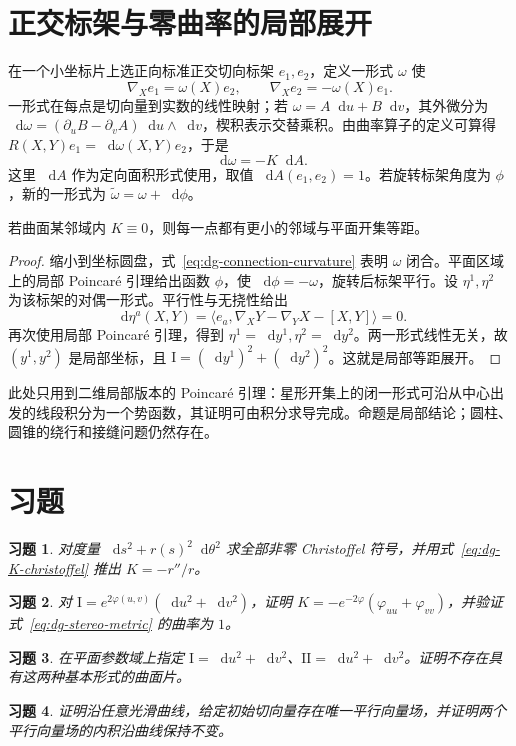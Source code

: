 \documentclass[UTF8,12pt,a4paper,fontset=fandol]{ctexbook}
\newcommand{\dd}{\mathop{}\!\mathrm d}
\newcommand{\ip}[2]{\langle #1,#2\rangle}
\newtheorem{exercise}{习题}[chapter]
\begin{document}
\section{正交标架与零曲率的局部展开}
在一个小坐标片上选正向标准正交切向标架 $e_1,e_2$，定义一形式 $\omega$ 使
\[
 \nabla_Xe_1=\omega(X)e_2,\qquad
 \nabla_Xe_2=-\omega(X)e_1.
\]
一形式在每点是切向量到实数的线性映射；若 $\omega=A\dd u+B\dd v$，其外微分为 $\dd\omega=(\partial_uB-\partial_vA)\dd u\wedge\dd v$，楔积表示交替乘积。由曲率算子的定义可算得 $R(X,Y)e_1=\dd\omega(X,Y)e_2$，于是
\begin{equation}
 \dd\omega=-K\dd A.
 \label{eq:dg-connection-curvature}
\end{equation}
这里 $\dd A$ 作为定向面积形式使用，取值 $\dd A(e_1,e_2)=1$。若旋转标架角度为 $\phi$，新的一形式为 $\widetilde\omega=\omega+\dd\phi$。

\begin{proposition}[零高斯曲率的局部平面模型]
若曲面某邻域内 $K\equiv0$，则每一点都有更小的邻域与平面开集等距。
\end{proposition}
\begin{proof}
缩小到坐标圆盘，式~\eqref{eq:dg-connection-curvature} 表明 $\omega$ 闭合。平面区域上的局部 Poincar\'e 引理给出函数 $\phi$，使 $\dd\phi=-\omega$，旋转后标架平行。设 $\eta^1,\eta^2$ 为该标架的对偶一形式。平行性与无挠性给出
\[
 \dd\eta^a(X,Y)=\ip{e_a}{\nabla_XY-\nabla_YX-[X,Y]}=0.
\]
再次使用局部 Poincar\'e 引理，得到 $\eta^1=\dd y^1,\eta^2=\dd y^2$。两一形式线性无关，故 $(y^1,y^2)$ 是局部坐标，且 $\mathrm I=(\dd y^1)^2+(\dd y^2)^2$。这就是局部等距展开。
\end{proof}
此处只用到二维局部版本的 Poincar\'e 引理：星形开集上的闭一形式可沿从中心出发的线段积分为一个势函数，其证明可由积分求导完成。命题是局部结论；圆柱、圆锥的绕行和接缝问题仍然存在。

\section{习题}
\begin{exercise}\label{ex:dg-connection-warped}
对度量 $\dd s^2+r(s)^2\dd\theta^2$ 求全部非零 Christoffel 符号，并用式~\eqref{eq:dg-K-christoffel} 推出 $K=-r''/r$。
\end{exercise}
\begin{exercise}\label{ex:dg-connection-conformal}
对 $\mathrm I=e^{2\varphi(u,v)}(\dd u^2+\dd v^2)$，证明 $K=-e^{-2\varphi}(\varphi_{uu}+\varphi_{vv})$，并验证式~\eqref{eq:dg-stereo-metric} 的曲率为 $1$。
\end{exercise}
\begin{exercise}\label{ex:dg-connection-incompatible}
在平面参数域上指定 $\mathrm I=\dd u^2+\dd v^2$、$\mathrm{II}=\dd u^2+\dd v^2$。证明不存在具有这两种基本形式的曲面片。
\end{exercise}
\begin{exercise}\label{ex:dg-connection-parallel}
证明沿任意光滑曲线，给定初始切向量存在唯一平行向量场，并证明两个平行向量场的内积沿曲线保持不变。
\end{exercise}
\end{document}
